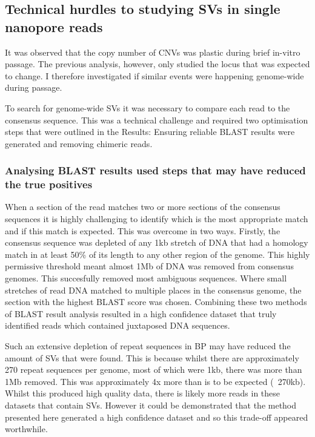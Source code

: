 \documentclass{article}
\begin{document}
\subsection{Technical hurdles to studying SVs in single nanopore reads}

It was observed that the copy number of CNVs was plastic during brief in-vitro passage. The previous analysis, however, only studied the locus that was expected to change. I therefore investigated if similar events were happening genome-wide during passage.


To search for genome-wide SVs it was necessary to compare each read to the consensus sequence. This was a technical challenge and required two optimisation steps that were outlined in the Results: Ensuring reliable BLAST results were generated and removing chimeric reads.


\subsubsection{Analysing BLAST results used steps that may have reduced the true positives}
When a section of the read matches two or more sections of the consensus sequences it is highly challenging to identify which is the most appropriate match and if this match is expected. This was overcome in two ways. Firstly, the consensus sequence was depleted of any 1kb stretch of DNA that had a homology match in at least 50\% of its length to any other region of the genome. This highly permissive threshold meant almost 1Mb of DNA was removed from consensus genomes. This succesfully removed most ambiguous sequences. Where small stretches of read DNA matched to multiple places in the consensus genome, the section with the highest BLAST score was chosen. Combining these two methods of BLAST result analysis resulted in a high confidence dataset that truly identified reads which contained juxtaposed DNA sequences.

Such an extensive depletion of repeat sequences in BP may have reduced the amount of SVs that were found. This is because whilst there are approximately 270 repeat sequences per genome, most of which were 1kb, there was more than 1Mb removed. This was approximately 4x more than is to be expected (~270kb). Whilst this produced high quality data, there is likely more reads in these datasets that contain SVs. However it could be demonstrated that the method presented here generated a high confidence dataset and so this trade-off appeared worthwhile.
\end{document}
